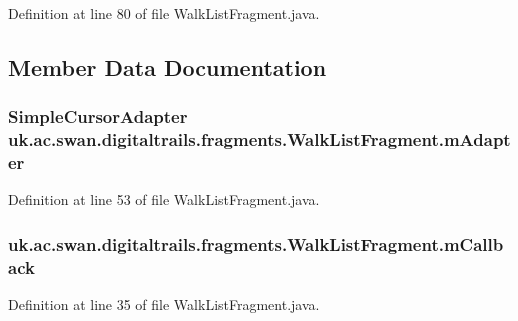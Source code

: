 Definition at line 80 of file Walk\+List\+Fragment.\+java.



\subsection{Member Data Documentation}
\hypertarget{classuk_1_1ac_1_1swan_1_1digitaltrails_1_1fragments_1_1_walk_list_fragment_aa092b25e6fad559ef03d2f7f0be6f691}{
\subsubsection[{m\+Adapter}]{\setlength{\rightskip}{0pt plus 5cm}Simple\+Cursor\+Adapter uk.\+ac.\+swan.\+digitaltrails.\+fragments.\+Walk\+List\+Fragment.\+m\+Adapter\hspace{0.3cm}{\ttfamily [protected]}}}\label{classuk_1_1ac_1_1swan_1_1digitaltrails_1_1fragments_1_1_walk_list_fragment_aa092b25e6fad559ef03d2f7f0be6f691}


Definition at line 53 of file Walk\+List\+Fragment.\+java.

\hypertarget{classuk_1_1ac_1_1swan_1_1digitaltrails_1_1fragments_1_1_walk_list_fragment_af887289d564f12d33172a0c0622f7f1d}{
\subsubsection[{m\+Callback}]{ uk.\+ac.\+swan.\+digitaltrails.\+fragments.\+Walk\+List\+Fragment.\+m\+Callback\hspace{0.3cm}{\ttfamily [private]}}}\label{classuk_1_1ac_1_1swan_1_1digitaltrails_1_1fragments_1_1_walk_list_fragment_af887289d564f12d33172a0c0622f7f1d}


Definition at line 35 of file Walk\+List\+Fragment.\+java.

